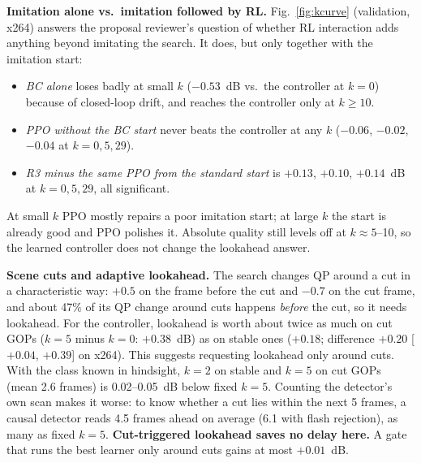 \documentclass[conference]{IEEEtran}
\begin{document}
\textbf{Imitation alone vs.\ imitation followed by RL.} Fig.~\ref{fig:kcurve} (validation, x264) answers the proposal reviewer's question of whether RL interaction adds anything beyond imitating the search. It does, but only together with the imitation start:
\begin{itemize}
\item \emph{BC alone} loses badly at small $k$ ($-0.53$~dB vs.\ the controller at $k{=}0$) because of closed-loop drift, and reaches the controller only at $k\ge10$.
\item \emph{PPO without the BC start} never beats the controller at any $k$ ($-0.06$, $-0.02$, $-0.04$ at $k{=}0,5,29$).
\item \emph{R3 minus the same PPO from the standard start} is $+0.13$, $+0.10$, $+0.14$~dB at $k{=}0,5,29$, all significant.
\end{itemize}
At small $k$ PPO mostly repairs a poor imitation start; at large $k$ the start is already good and PPO polishes it. Absolute quality still levels off at $k\approx5$--10, so the learned controller does not change the lookahead answer.

\textbf{Scene cuts and adaptive lookahead.} The search changes QP around a cut in a characteristic way: $+0.5$ on the frame before the cut and $-0.7$ on the cut frame, and about 47\% of its QP change around cuts happens \emph{before} the cut, so it needs lookahead. For the controller, lookahead is worth about twice as much on cut GOPs ($k{=}5$ minus $k{=}0$: $+0.38$~dB) as on stable ones ($+0.18$; difference $+0.20$ [$+0.04$, $+0.39$] on x264). This suggests requesting lookahead only around cuts. With the class known in hindsight, $k{=}2$ on stable and $k{=}5$ on cut GOPs (mean 2.6 frames) is 0.02--0.05~dB below fixed $k{=}5$. Counting the detector's own scan makes it worse: to know whether a cut lies within the next 5 frames, a causal detector reads 4.5 frames ahead on average (6.1 with flash rejection), as many as fixed $k{=}5$. \textbf{Cut-triggered lookahead saves no delay here.} A gate that runs the best learner only around cuts gains at most $+0.01$~dB.
\end{document}
